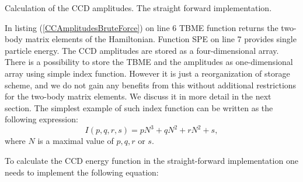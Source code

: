 \documentclass[twoside,english]{uiofysmaster}
\begin{document}
\IncMargin{1em}
\begin{algorithm}[H]
	\SetAlgoLined
	
	\BlankLine

		\For{$i\leftarrow 1$ \KwTo $N_{\mathrm{Fermi}}$}{
			\For{$j\leftarrow 1$ \KwTo $N_{\mathrm{Fermi}}$}{  %
				\For{$a\leftarrow N_{\mathrm{Fermi}}$ \KwTo $N_{\mathrm{States}}$}{
					\For{$b\leftarrow N_{\mathrm{Fermi}}$ \KwTo $N_{\mathrm{states}}$}{
						V $\leftarrow$ TBME($i,j,a,b$)\\
						Denominator $\leftarrow$ SPE($i$) + SPE($j$) - SPE($a$) - SPE($b$)\\
					\For{$c\leftarrow N_{\mathrm{Fermi}}$ \KwTo $N_{\mathrm{States}}$}{
						\For{$d\leftarrow N_{\mathrm{Fermi}}$ \KwTo $N_{\mathrm{states}}$}{
						Amplitudes($i,j,a,b$) $\leftarrow$ V + $\frac{1}{2}$TBME($a,b,c,d$)AmplitudesOld($c,d,i,j$)	
						}
					}
					Amplitudes($i,j,a,b$) $\leftarrow$ + 6 last terms\\
					Amplitudes($i,j,a,b$) /= Denominator
					}
				}
			}
		}
	\caption{Calculation of the CCD amplitudes. The straight forward implementation.}\label{CCAmplitudesBruteForce}
\end{algorithm}\DecMargin{1em}

In listing (\ref{CCAmplitudesBruteForce}) on line 6 TBME function returns the two-body matrix elements of the Hamiltonian. Function SPE on line 7 provides single particle energy. The CCD amplitudes are stored as a four-dimensional array. 
There is a possibility to store the TBME and the amplitudes as one-dimensional array using simple index function. However it is just a reorganization of storage scheme, and we do not gain any benefits from this without additional restrictions for the two-body matrix elements. We discuss it in more detail in the next section. The simplest example of such index function can be written as the following expression:
\begin{equation}\label{simplemapping}
	I(p,q,r,s) = pN^3+ qN^2+ rN^2+ s,
\end{equation}  
where $N$ is a maximal value of $p,q,r$ or $s$.

To calculate the CCD energy function in the straight-forward implementation one needs to implement the following equation:
\end{document}
